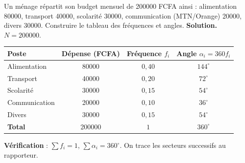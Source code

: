 \documentclass[11pt]{article}
\begin{document}
\begin{exoresolu}
Un ménage répartit son budget mensuel de \num{200000} FCFA ainsi : alimentation \num{80000}, transport \num{40000}, scolarité \num{30000}, communication (MTN/Orange) \num{20000}, divers \num{30000}. Construire le tableau des fréquences et angles.
\tcblower
\textbf{Solution.} $N = \num{200000}$.
\begin{center}
\begin{tabular}{|l|c|c|c|}
\hline
\rowcolor{popblueL} Poste & Dépense (FCFA) & Fréquence $f_i$ & Angle $\alpha_i = 360 f_i$ \\
\hline
Alimentation & \num{80000} & $0{,}40$ & $144^\circ$ \\
\hline
Transport & \num{40000} & $0{,}20$ & $72^\circ$ \\
\hline
Scolarité & \num{30000} & $0{,}15$ & $54^\circ$ \\
\hline
Communication & \num{20000} & $0{,}10$ & $36^\circ$ \\
\hline
Divers & \num{30000} & $0{,}15$ & $54^\circ$ \\
\hline
\textbf{Total} & \num{200000} & $1$ & $360^\circ$ \\
\hline
\end{tabular}
\end{center}
\textbf{Vérification} : $\sum f_i = 1$, $\sum \alpha_i = 360^\circ$. On trace les secteurs successifs au rapporteur.
\end{exoresolu}
\end{document}
